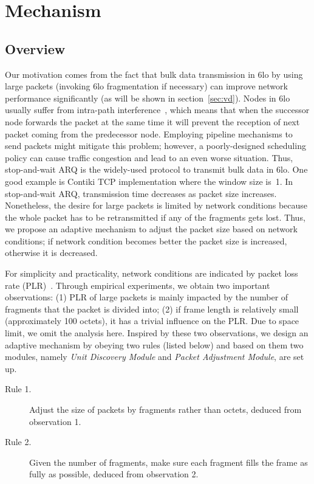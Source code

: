 \documentclass[runningheads,a4paper]{llncs}
\begin{document}
\section{Mechanism}

\subsection{Overview}\label{sec:ov}
Our motivation comes from the fact that bulk data transmission in 6lo by using large packets (invoking 6lo fragmentation if necessary) can improve network performance significantly (as will be shown in section~\ref{sec:vd}). Nodes in 6lo usually suffer from intra-path interference~\cite{Kim2007}, which means that when the successor node forwards the packet at the same time it will prevent the reception of next packet coming from the predecessor node. Employing pipeline mechanisms to send packets might mitigate this problem; however, a poorly-designed scheduling policy can cause traffic congestion and lead to an even worse situation. Thus, stop-and-wait ARQ is the widely-used protocol to transmit bulk data in 6lo. One good example is Contiki TCP implementation where the window size is~1. In stop-and-wait ARQ, transmission time decreases as packet size increases. Nonetheless, the desire for large packets is limited by network conditions because the whole packet has to be retransmitted if any of the fragments gets lost. Thus, we propose an adaptive mechanism to adjust the packet size based on network conditions; if network condition becomes better the packet size is increased, otherwise it is decreased.

For simplicity and practicality, network conditions are indicated by packet loss rate (PLR)~\cite{Bacc2012}. Through empirical experiments, we obtain two important observations: (1) PLR of large packets is mainly impacted by the number of fragments that the packet is divided into; (2) if frame length is relatively small (approximately 100 octets), it has a trivial influence on the PLR. Due to space limit, we omit the analysis here. Inspired by these two observations, we design an adaptive mechanism by obeying two rules (listed below) and based on them two modules, namely \emph{Unit Discovery Module} and \emph{Packet Adjustment Module}, are set up.
\begin{description}
	\item[Rule 1.] Adjust the size of packets by fragments rather than octets, deduced from observation 1.
	\item[Rule 2.] Given the number of fragments, make sure each fragment fills the frame as fully as possible, deduced from observation 2.
\end{description}
\end{document}
